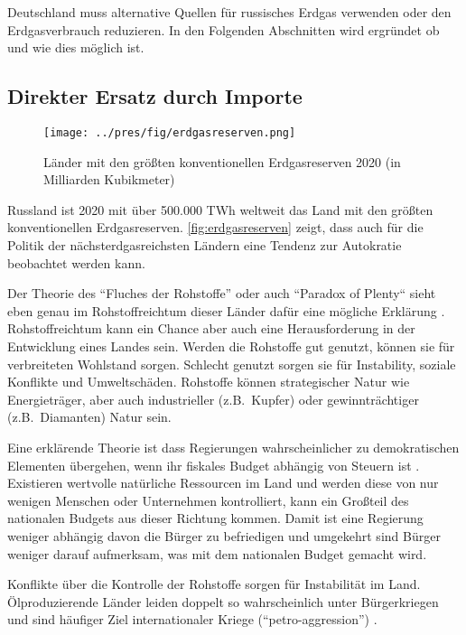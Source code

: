 Deutschland muss alternative Quellen für russisches Erdgas verwenden oder den Erdgasverbrauch reduzieren. In den Folgenden Abschnitten wird ergründet ob und wie dies möglich ist.

\subsection{Direkter Ersatz durch Importe}

\begin{figure}
\centering
\texttt{[image: ../pres/fig/erdgasreserven.png]}
\caption{Länder mit den größten konventionellen Erdgasreserven 2020 (in Milliarden Kubikmeter) \cite{statista-erdgasreserven}}
\label{fig:erdgasreserven}
\end{figure}

Russland ist 2020 mit über 500.000 TWh weltweit das Land mit den größten konventionellen Erdgasreserven. \autoref{fig:erdgasreserven} zeigt, dass auch für die Politik der nächsterdgasreichsten Ländern eine Tendenz zur Autokratie beobachtet werden kann. 

Der Theorie des ``Fluches der Rohstoffe'' oder auch ``Paradox of Plenty`` sieht eben genau im Rohstoffreichtum dieser Länder dafür eine mögliche Erklärung \cite{gabler}. Rohstoffreichtum kann ein Chance aber auch eine Herausforderung in der Entwicklung eines Landes sein. Werden die Rohstoffe gut genutzt, können sie für verbreiteten Wohlstand sorgen. Schlecht genutzt sorgen sie für Instability, soziale Konflikte und Umweltschäden. 
Rohstoffe können strategischer Natur wie Energieträger, aber auch industrieller (z.B.~Kupfer) oder gewinnträchtiger (z.B.~Diamanten) Natur sein.

Eine erklärende Theorie ist dass Regierungen wahrscheinlicher zu demokratischen Elementen übergehen, wenn ihr fiskales Budget abhängig von Steuern ist \cite{nrgi}. Existieren wertvolle natürliche Ressourcen im Land und werden diese von nur wenigen Menschen oder Unternehmen kontrolliert, kann ein Großteil des nationalen Budgets aus dieser Richtung kommen. Damit ist eine Regierung weniger abhängig davon die Bürger zu befriedigen und umgekehrt sind Bürger weniger darauf aufmerksam, was mit dem nationalen Budget gemacht wird. 

Konflikte über die Kontrolle der Rohstoffe sorgen für Instabilität im Land. Ölproduzierende Länder leiden doppelt so wahrscheinlich unter Bürgerkriegen und sind häufiger Ziel internationaler Kriege (``petro-aggression'') \cite{nrgi}.

